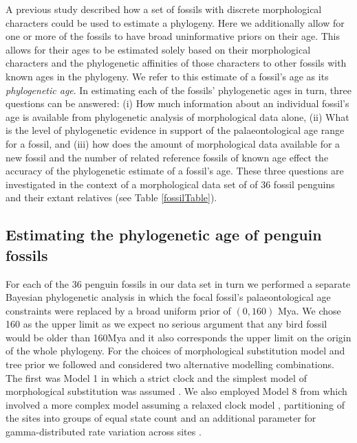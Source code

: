 \documentclass[11pt]{article}
\begin{document}
A previous study described how a set of fossils with discrete morphological characters could be used to estimate a phylogeny. Here we additionally allow for one or more of the fossils to have broad uninformative priors on their age. This allows for their ages to be estimated solely based on their morphological characters and the phylogenetic affinities of those characters to other fossils with known ages in the phylogeny. We refer to this estimate of a fossil's age as its {\em phylogenetic age}. In estimating each of the fossils' phylogenetic ages in turn, three questions can be answered: (i) How much information about an individual fossil's age is available from phylogenetic analysis of morphological data alone, (ii) What is the level of phylogenetic evidence in support of the palaeontological age range for a fossil, and (iii) how does the amount of morphological data available for a new fossil and the number of related reference fossils of known age effect the accuracy of the phylogenetic estimate of a fossil's age. These three questions are investigated in the context of a morphological data set of of 36 fossil penguins and their extant relatives \autocite{gavryushkina2015bayesian} (see Table \ref{fossilTable}).

\subsection*{Estimating the phylogenetic age of penguin fossils}

For each of the 36 penguin fossils in our data set in turn we performed a separate Bayesian phylogenetic analysis in which the focal fossil's palaeontological age constraints were replaced by a broad uniform prior of $(0,160)$ Mya. We chose 160 as the upper limit as we expect no serious argument that any bird fossil would be older than 160Mya and it also corresponds the upper limit on the origin of the whole phylogeny. For the choices of morphological substitution model and tree prior we followed \textcite{gavryushkina2015bayesian} and considered two alternative modelling combinations. The first was Model 1 in which a strict clock and the simplest model of morphological substitution was assumed \autocite{Lewis2001}. We also employed Model 8 from \textcite{gavryushkina2015bayesian} which involved a more complex model assuming a relaxed clock model \autocite{Drummond2006}, partitioning of the sites into groups of equal state count and an additional parameter for gamma-distributed rate variation across sites \autocite{yang:1994ma}.
\end{document}
